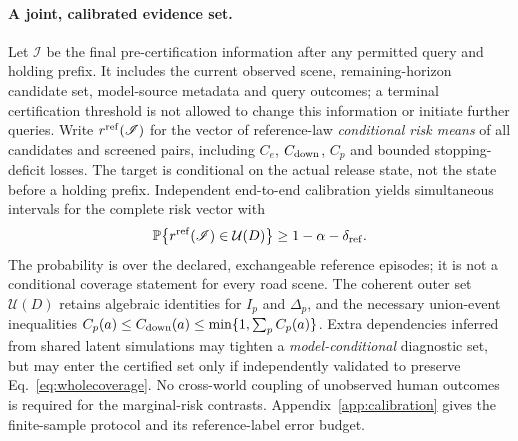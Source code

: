 \documentclass[10pt]{article}
\newcommand{\Prob}{\mathbb{P}}
\begin{document}
\paragraph{A joint, calibrated evidence set.}
Let $\mathscr I$ be the final pre-certification information after any permitted query and holding prefix. It includes the current observed scene, remaining-horizon candidate set, model-source metadata and query outcomes; a terminal certification threshold is not allowed to change this information or initiate further queries. Write $r^{\rm ref}(\mathscr I)$ for the vector of reference-law \emph{conditional risk means} of all candidates and screened pairs, including $C_e$, $C_{\rm down}$, $C_p$ and bounded stopping-deficit losses. The target is conditional on the actual release state, not the state before a holding prefix. Independent end-to-end calibration yields simultaneous intervals for the complete risk vector with
\begin{equation}
 \Prob\bigl\{r^{\rm ref}(\mathscr I)\in\mathcal U(D)\bigr\}
 \ge1-\alpha-\delta_{\rm ref}.
 \label{eq:wholecoverage}
\end{equation}
The probability is over the declared, exchangeable reference episodes; it is not a conditional coverage statement for every road scene. The coherent outer set $\mathcal U(D)$ retains algebraic identities for $I_p$ and $\Delta_p$, and the necessary union-event inequalities $C_p(a)\le C_{\rm down}(a)\le\min\{1,\sum_p C_p(a)\}$. Extra dependencies inferred from shared latent simulations may tighten a \emph{model-conditional} diagnostic set, but may enter the certified set only if independently validated to preserve Eq.~\eqref{eq:wholecoverage}. No cross-world coupling of unobserved human outcomes is required for the marginal-risk contrasts. Appendix~\ref{app:calibration} gives the finite-sample protocol and its reference-label error budget.
\end{document}
